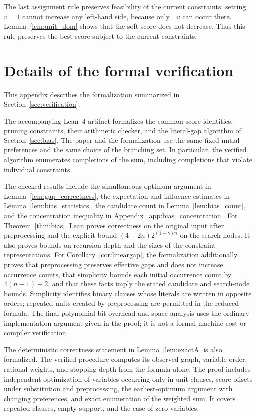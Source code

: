 \documentclass[11pt,a4paper]{article}
\theoremstyle{definition}
\theoremstyle{remark}
\begin{document}
The last assignment rule preserves feasibility of the current constraints:
setting $v=1$ cannot increase any left-hand side, because only $\neg v$ can
occur there. Lemma~\ref{lem:unit_dom} shows that the soft score does not
decrease. Thus this rule preserves the best score subject to the current
constraints.

\section{Details of the formal verification}\label{app:verification}

This appendix describes the formalization summarized in
Section~\ref{sec:verification}.

The accompanying Lean~4 artifact formalizes the common score identities,
pruning constraints, their arithmetic checker, and the literal-gap
algorithm of Section~\ref{sec:bias}. The paper and the formalization use
the same fixed initial preferences and the same choice of the branching
set. In particular, the verified algorithm enumerates completions of the
sum, including completions that violate individual constraints.

The checked results include the simultaneous-optimum argument in
Lemma~\ref{lem:gap_correctness}, the expectation and influence estimates
in Lemma~\ref{lem:bias_statistics}, the candidate count in
Lemma~\ref{lem:bias_count}, and the concentration inequality in
Appendix~\ref{app:bias_concentration}. For Theorem~\ref{thm:bias}, Lean
proves correctness on the original input after preprocessing and the
explicit bound $(4+2n)2^{(1-\gamma)n}$ on the search nodes. It also proves
bounds on recursion depth and the sizes of the constraint representations.
For Corollary~\ref{cor:lineargap}, the formalization additionally proves
that preprocessing preserves effective gaps and does not increase
occurrence counts, that simplicity bounds each initial occurrence count
by $4(n-1)+2$, and that these facts imply the stated candidate and
search-node bounds. Simplicity identifies binary clauses whose literals
are written in opposite orders; repeated units created by preprocessing
are permitted in the reduced formula.
The final polynomial bit-overhead and space analysis uses the ordinary
implementation argument given in the proof; it is not a formal machine-cost
or compiler verification.

The deterministic correctness statement in Lemma~\ref{lem:exactA} is also
formalized. The verified procedure computes its observed graph, variable
order, rational weights, and stopping depth from the formula alone.
The proof includes independent optimization of variables occurring only
in unit clauses, score offsets under substitution and preprocessing,
the earliest-optimum argument with changing preferences, and exact
enumeration of the weighted sum. It covers repeated clauses, empty
support, and the case of zero variables.
\end{document}
